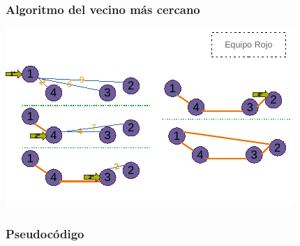 \documentclass[13pt]{beamer}
\begin{document}
    \begin{frame}
		\frametitle{Algoritmo del vecino más cercano}
		\begin{center}
			\includegraphics[scale=1.5]{./img/DibVecCercano.pdf}
		\end{center}
	\end{frame}

	\begin{frame}
		\frametitle{Pseudocódigo}

	\end{frame}
\end{document}
